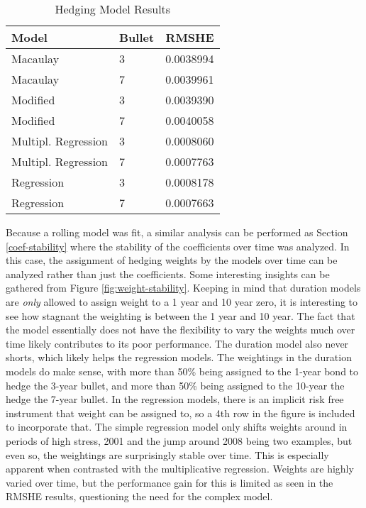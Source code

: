 \documentclass[openany]{book}
\theoremstyle{definition}
\theoremstyle{definition}
\theoremstyle{definition}
\theoremstyle{remark}
\begin{document}
\begin{table}[H]

\caption{\label{tab:hedging-results}Hedging Model Results}
\centering
\begin{tabular}[t]{llr}
\toprule
Model & Bullet & RMSHE\\
\midrule
Macaulay & 3 & 0.0038994\\
Macaulay & 7 & 0.0039961\\
Modified & 3 & 0.0039390\\
Modified & 7 & 0.0040058\\
Multipl. Regression & 3 & 0.0008060\\
\addlinespace
Multipl. Regression & 7 & 0.0007763\\
Regression & 3 & 0.0008178\\
Regression & 7 & 0.0007663\\
\bottomrule
\end{tabular}
\end{table}

\normalsize

\small

\normalsize

Because a rolling model was fit, a similar analysis can be performed as
Section \ref{coef-stability} where the stability of the coefficients
over time was analyzed. In this case, the assignment of hedging weights
by the models over time can be analyzed rather than just the
coefficients. Some interesting insights can be gathered from Figure
\ref{fig:weight-stability}. Keeping in mind that duration models are
\emph{only} allowed to assign weight to a 1 year and 10 year zero, it is
interesting to see how stagnant the weighting is between the 1 year and
10 year. The fact that the model essentially does not have the
flexibility to vary the weights much over time likely contributes to its
poor performance. The duration model also never shorts, which likely
helps the regression models. The weightings in the duration models do
make sense, with more than 50\% being assigned to the 1-year bond to
hedge the 3-year bullet, and more than 50\% being assigned to the
10-year the hedge the 7-year bullet. In the regression models, there is
an implicit risk free instrument that weight can be assigned to, so a
4th row in the figure is included to incorporate that. The simple
regression model only shifts weights around in periods of high stress,
2001 and the jump around 2008 being two examples, but even so, the
weightings are surprisingly stable over time. This is especially
apparent when contrasted with the multiplicative regression. Weights are
highly varied over time, but the performance gain for this is limited as
seen in the RMSHE results, questioning the need for the complex model.
\end{document}
